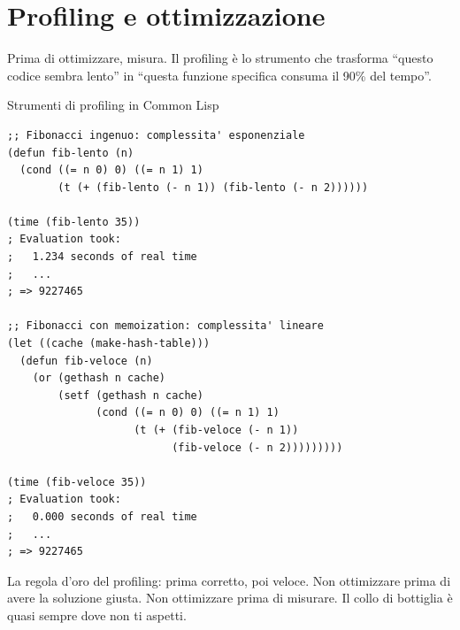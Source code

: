 \section{Profiling e ottimizzazione}

Prima di ottimizzare, misura.
Il profiling è lo strumento che trasforma ``questo codice
sembra lento'' in ``questa funzione specifica consuma il 90\%
del tempo''.

\begin{concetto}{Strumenti di profiling in Common Lisp}

\boxsep
{}
\end{concetto}

\begin{esempio}
\begin{lstlisting}
;; Fibonacci ingenuo: complessita' esponenziale
(defun fib-lento (n)
  (cond ((= n 0) 0) ((= n 1) 1)
        (t (+ (fib-lento (- n 1)) (fib-lento (- n 2))))))

(time (fib-lento 35))
; Evaluation took:
;   1.234 seconds of real time
;   ...
; => 9227465

;; Fibonacci con memoization: complessita' lineare
(let ((cache (make-hash-table)))
  (defun fib-veloce (n)
    (or (gethash n cache)
        (setf (gethash n cache)
              (cond ((= n 0) 0) ((= n 1) 1)
                    (t (+ (fib-veloce (- n 1))
                          (fib-veloce (- n 2)))))))))

(time (fib-veloce 35))
; Evaluation took:
;   0.000 seconds of real time
;   ...
; => 9227465
\end{lstlisting}
\end{esempio}

\begin{intuizione}
La regola d'oro del profiling: prima corretto, poi veloce.
Non ottimizzare prima di avere la soluzione giusta.
Non ottimizzare prima di misurare.
Il collo di bottiglia è quasi sempre dove non ti aspetti.
\end{intuizione}

